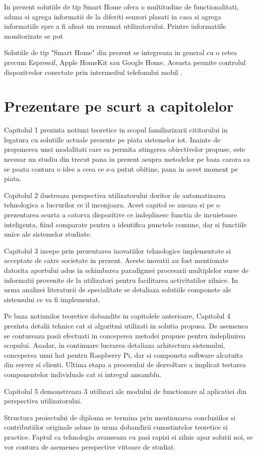 In prezent solutiile de tip Smart Home ofera o multitudine de functionalitati, aduna si agrega informatii de la diferiti senzori plasati in casa si agrega informatiile spre a fi afisat un rezumat utilizatorului. Printre informatiile monitorizate se pot 

Solutiile de tip "Smart Home" din prezent se integreaza in general cu o retea precum Espressif, Apple HomeKit sau Google Home. Aceasta permite controlul dispozitvelor conectate prin intermediul telefonului mobil \cite{RISTESKASTOJKOSKA20171454}.


\section {Prezentare pe scurt a capitolelor}

Capitolul 1 prezinta notiuni teoretice in scopul familiarizarii cititorului in legatura cu solutiile actuale prezente pe piata sistemelor \acrshort{iot}. Inainte de propunerea unei modalitati care sa permita atingerea obiectivelor propuse, este necesar un studiu din trecut pana in prezent asupra metodelor pe baza carora sa se poata contura o idee a ceea ce s-a putut obitine, pana in acest moment pe piata.

Copitolul 2 ilustreaza perspectiva utilizatorului doritor de automatizarea tehnologica a lucrurilor ce il inconjoara. Acest capitol se axeaza si pe o prezentarea scurta a catorva dispozitive ce indeplinesc functia de incuietoare inteligenta, fiind comparate pentru a identifica punctele comune, dar si functiile unice ale sistemelor studiate.

Capitolul 3 incepe prin prezentarea inovatiilor tehnologice implementate si acceptate de catre societate in prezent. Aceste inovatii au fost mentionate datorita aportului adus in schimbarea paradigmei procesarii multiplelor surse de informatii provenite de la utilizatori pentru facilitarea activitatilor zilnice. In urma analizei literaturii de specialitate se detaliaza solutiile componete ale sistemului ce va fi implementat.

Pe baza notiunilor teoretice dobandite in capitolele anterioare, Capitolul 4 prezinta detalii tehnice cat si algoritmi utilizati in solutia propusa. De asemenea se contureaza pasii efectuati in conceperea metodei propuse pentru indeplinirea scopului. Asadar, in continuare lucrarea detaliaza arhitectura sistemului, conceperea unui \acrshort{hat} pentru Raspberry Pi, dar si componeta software alcatuita din server si clienti. Ultima etapa a procesului de dezvoltare a implicat testarea componentelor individuale cat si intregul ansamblu.

Capitolul 5 demonstreaza 3 utilizari ale modului de functionare al aplicatiei din perspectiva utilizatorului.

Structura proiectului de diploma se termina prin mentionarea concluziilor si contributiilor originale aduse in urma dobandirii cunostintelor teoretice si practice. Faptul ca tehnologia avanseaza cu pasi rapizi si zilnic apar solutii noi, se vor contura de asemenea perspective viitoare de studiat.
